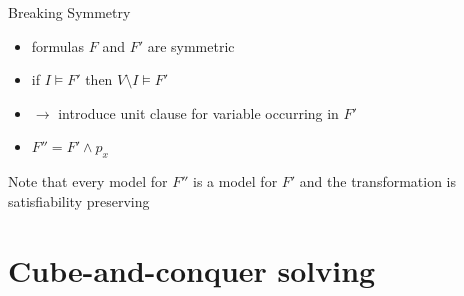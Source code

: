 \documentclass[c,8pt,xcolor...,x11names,usenames,dvipsnames]{beamer}
\begin{document}
\begin{frame}{Breaking Symmetry}
	\begin{itemize}
		\item formulas $F$ and $F'$ are symmetric
		\pause
		\item if $I \models F'$ then $V \setminus I \models F'$
		\pause
		\item $\rightarrow$ introduce unit clause for variable occurring in $F'$
		\item $F'' = F' \wedge p_x$
	\end{itemize}
	\vspace{5px}
	\pause
	Note that every model for $F''$ is a model for $F'$ and the transformation is satisfiability preserving
\end{frame}


\section{Cube-and-conquer solving}
\end{document}
